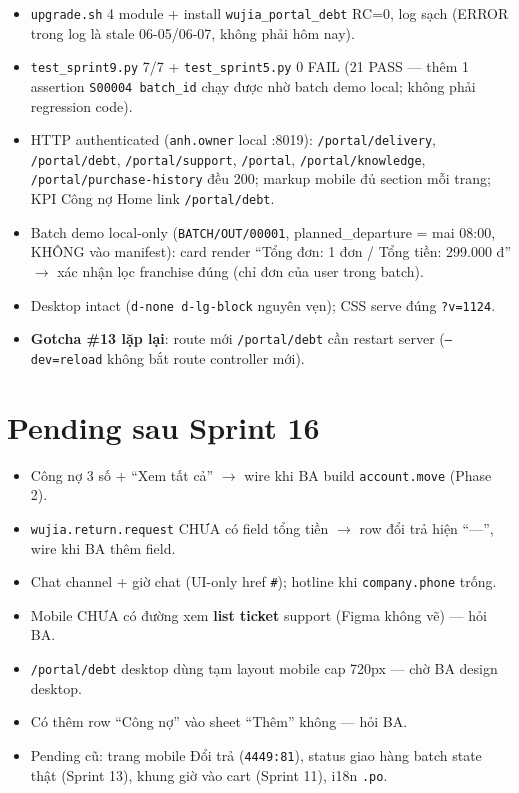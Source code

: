 \begin{itemize}
  \item \texttt{upgrade.sh} 4 module + install \texttt{wujia\_portal\_debt} RC=0, log
        sạch (ERROR trong log là stale 06-05/06-07, không phải hôm nay).
  \item \texttt{test\_sprint9.py} 7/7 + \texttt{test\_sprint5.py} 0 FAIL (21 PASS ---
        thêm 1 assertion \texttt{S00004 batch\_id} chạy được nhờ batch demo local; không
        phải regression code).
  \item HTTP authenticated (\texttt{anh.owner} local :8019): \texttt{/portal/delivery},
        \texttt{/portal/debt}, \texttt{/portal/support}, \texttt{/portal},
        \texttt{/portal/knowledge}, \texttt{/portal/purchase-history} đều 200; markup
        mobile đủ section mỗi trang; KPI Công nợ Home link \texttt{/portal/debt}.
  \item Batch demo local-only (\texttt{BATCH/OUT/00001}, planned\_departure = mai
        08:00, KHÔNG vào manifest): card render ``Tổng đơn: 1 đơn / Tổng tiền: 299.000 đ''
        \(\rightarrow\) xác nhận lọc franchise đúng (chỉ đơn của user trong batch).
  \item Desktop intact (\texttt{d-none d-lg-block} nguyên vẹn); CSS serve đúng
        \texttt{?v=1124}.
  \item \textbf{Gotcha \#13 lặp lại}: route mới \texttt{/portal/debt} cần restart server
        (\texttt{--dev=reload} không bắt route controller mới).
\end{itemize}

\section{Pending sau Sprint 16}

\begin{itemize}
  \item Công nợ 3 số + ``Xem tất cả'' \(\rightarrow\) wire khi BA build
        \texttt{account.move} (Phase 2).
  \item \texttt{wujia.return.request} CHƯA có field tổng tiền \(\rightarrow\) row đổi trả
        hiện ``---'', wire khi BA thêm field.
  \item Chat channel + giờ chat (UI-only href \texttt{\#}); hotline khi
        \texttt{company.phone} trống.
  \item Mobile CHƯA có đường xem \textbf{list ticket} support (Figma không vẽ) ---
        hỏi BA.
  \item \texttt{/portal/debt} desktop dùng tạm layout mobile cap 720px --- chờ BA design
        desktop.
  \item Có thêm row ``Công nợ'' vào sheet ``Thêm'' không --- hỏi BA.
  \item Pending cũ: trang mobile Đổi trả (\texttt{4449:81}), status giao hàng batch state
        thật (Sprint 13), khung giờ vào cart (Sprint 11), i18n \texttt{.po}.
\end{itemize}
